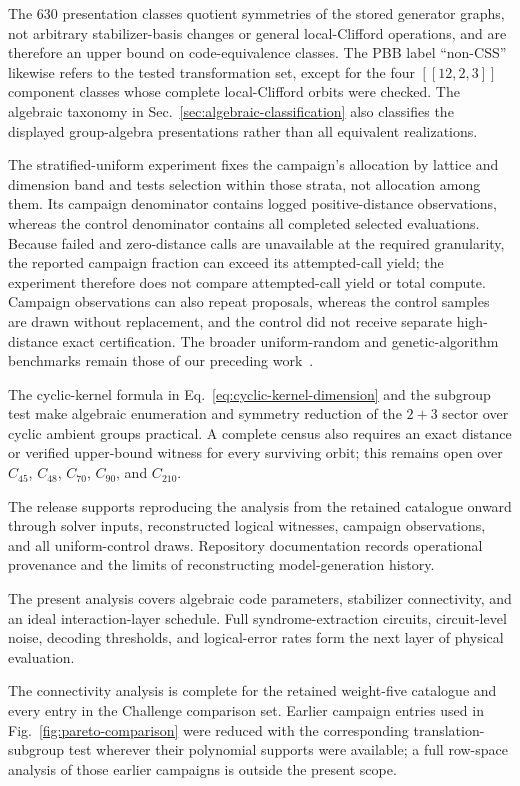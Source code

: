 \documentclass[aps,prx,twocolumn,superscriptaddress,nofootinbib,floatfix]{revtex4-2}
\newcommand{\code}[1]{\ensuremath{\left[\!\left[#1\right]\!\right]}}
\begin{document}
The 630 presentation classes quotient symmetries of the stored generator
graphs, not arbitrary stabilizer-basis changes or general local-Clifford
operations, and are therefore an upper bound on code-equivalence classes.  The
PBB label ``non-CSS'' likewise refers to the tested transformation set, except
for the four $\code{12,2,3}$ component classes whose complete local-Clifford
orbits were checked.  The algebraic taxonomy in
Sec.~\ref{sec:algebraic-classification} also classifies the displayed
group-algebra presentations rather than all equivalent realizations.

The stratified-uniform experiment fixes the campaign's allocation by lattice
and dimension band and tests selection within those strata, not allocation
among them.  Its campaign denominator contains logged positive-distance
observations, whereas the control denominator contains all completed selected
evaluations.  Because failed and zero-distance calls are unavailable at the
required granularity, the reported campaign fraction can exceed its
attempted-call yield; the experiment therefore does not compare attempted-call
yield or total compute.  Campaign observations can also repeat
proposals, whereas the control samples are drawn without replacement, and the
control did not receive separate high-distance exact certification.
The broader uniform-random and genetic-algorithm benchmarks remain those of
our preceding work~\cite{cruzbenito2026evolutionary}.

The cyclic-kernel formula in Eq.~\eqref{eq:cyclic-kernel-dimension} and the
subgroup test make algebraic enumeration and symmetry reduction of the $2+3$
sector over cyclic ambient groups practical.  A complete census also requires
an exact distance or verified upper-bound witness for every surviving orbit;
this remains open over $C_{45}$, $C_{48}$, $C_{70}$, $C_{90}$, and $C_{210}$.

The release supports reproducing the analysis from the retained catalogue onward
through solver inputs, reconstructed logical witnesses, campaign observations,
and all uniform-control draws.  Repository documentation records operational
provenance and the limits of reconstructing model-generation history.

The present analysis covers algebraic code parameters, stabilizer connectivity,
and an ideal interaction-layer schedule.  Full syndrome-extraction circuits,
circuit-level noise, decoding thresholds, and logical-error rates form the next
layer of physical evaluation.

The connectivity analysis is complete for the retained weight-five catalogue
and every entry in the Challenge comparison set.  Earlier campaign entries
used in Fig.~\ref{fig:pareto-comparison} were reduced with the corresponding
translation-subgroup test wherever their polynomial supports were available; a
full row-space analysis of those earlier campaigns is outside the present
scope.
\end{document}
